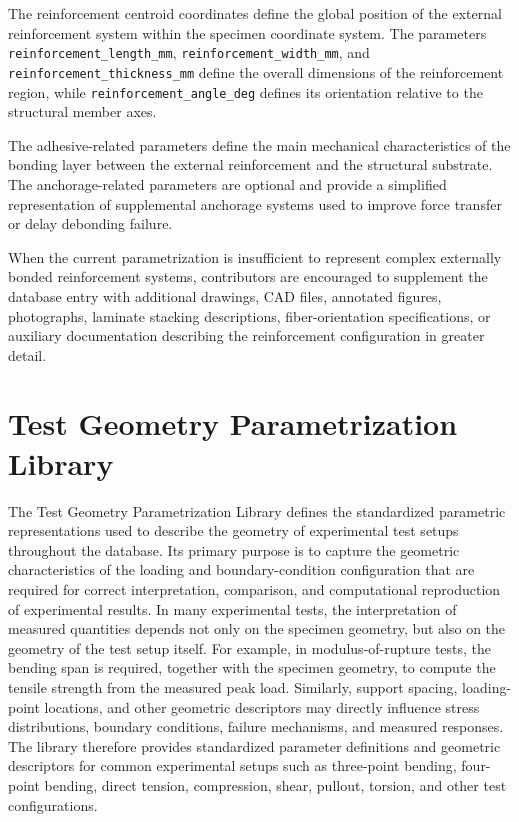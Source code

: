 \documentclass[11pt]{book}
\begin{document}
The reinforcement centroid coordinates define the global position of the external reinforcement system within the specimen coordinate system. The parameters \texttt{reinforcement\_length\_mm}, \texttt{reinforcement\_width\_mm}, and \texttt{reinforcement\_thickness\_mm} define the overall dimensions of the reinforcement region, while \texttt{reinforcement\_angle\_deg} defines its orientation relative to the structural member axes.

The adhesive-related parameters define the main mechanical characteristics of the bonding layer between the external reinforcement and the structural substrate. The anchorage-related parameters are optional and provide a simplified representation of supplemental anchorage systems used to improve force transfer or delay debonding failure.

When the current parametrization is insufficient to represent complex externally bonded reinforcement systems, contributors are encouraged to supplement the database entry with additional drawings, CAD files, annotated figures, photographs, laminate stacking descriptions, fiber-orientation specifications, or auxiliary documentation describing the reinforcement configuration in greater detail.

\newpage
\section{Test Geometry Parametrization Library}
The Test Geometry Parametrization Library defines the standardized parametric representations used to describe the geometry of experimental test setups throughout the database. Its primary purpose is to capture the geometric characteristics of the loading and boundary-condition configuration that are required for correct interpretation, comparison, and computational reproduction of experimental results. In many experimental tests, the interpretation of measured quantities depends not only on the specimen geometry, but also on the geometry of the test setup itself. For example, in modulus-of-rupture tests, the bending span is required, together with the specimen geometry, to compute the tensile strength from the measured peak load. Similarly, support spacing, loading-point locations, and other geometric descriptors may directly influence stress distributions, boundary conditions, failure mechanisms, and measured responses. The library therefore provides standardized parameter definitions and geometric descriptors for common experimental setups such as three-point bending, four-point bending, direct tension, compression, shear, pullout, torsion, and other test configurations. 
\end{document}
